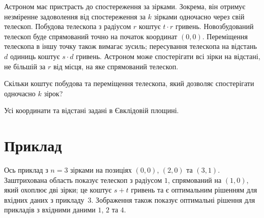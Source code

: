 
\noindent
Астроном має пристрасть до спостереження за зірками.
Зокрема, він отримує незміренне задоволення від спостереження за $k$ зірками одночасно через свій телескоп.
Побудова телескопа з радіусом $r$ коштує $t\cdot r$ гривень.
Новозбудований телескоп буде спрямований точно на початок координат $(0,0)$.
Переміщення телескопа в іншу точку також вимагає зусиль;
пересування телескопа на відстань $d$ одиниць коштує $s\cdot d$ гривень.
Астроном може спостерігати всі зірки на відстані, не більшій за $r$ від місця, на яке спрямований телескоп.

Скільки коштує побудова та переміщення телескопа, який дозволяє спостерігати одночасно $k$ зірок?

\medskip

Усі координати та відстані задані в Євклідовій площині.


\section*{Приклад}

Ось приклад з $n=3$ зірками на позиціях $(0,0)$, $(2,0)$ та $(3,1)$.
Заштрихована область показує телескоп з радіусом $1$, спрямований на $(1,0)$, який охоплює дві зірки; це коштує $s + t$ гривень та є оптимальним рішенням для вхідних даних з прикладу~$3$.
Зображення також показує оптимальні рішення для прикладів з вхідними даними $1$, $2$ та $4$.

